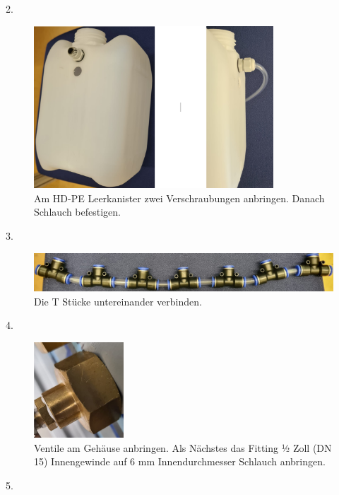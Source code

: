 \documentclass[10pt,a4paper]{report}
\begin{document}
	2.
	
	\begin{figure}[htb]
		\includegraphics[width=0.8\textwidth]{zu2.}
		\centering
		\caption{Am HD-PE Leerkanister zwei Verschraubungen anbringen. Danach Schlauch befestigen.}
	\end{figure}
	\newpage
	
	3.
	
	\begin{figure}[htb]
		\includegraphics[width=1\textwidth]{zu3.}
		\centering
		\caption{Die T Stücke untereinander verbinden.}
	\end{figure}
	
	4.
	
	\begin{figure}[htb]
		\includegraphics[width=0.3\textwidth]{zu4.}
		\centering
		\caption{Ventile am Gehäuse anbringen. Als Nächstes das Fitting ½ Zoll (DN 15) Innengewinde auf 6 mm Innendurchmesser Schlauch anbringen.}
	\end{figure}
		
	5.
	
\end{document}
